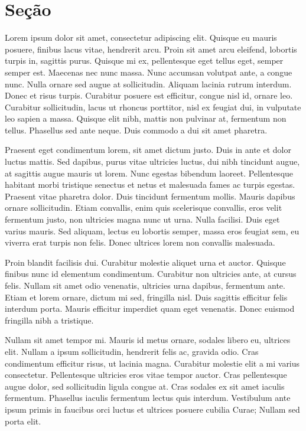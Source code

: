 \documentclass{article}
\begin{document}
	
	\section{Seção}
	
	Lorem ipsum dolor sit amet, consectetur adipiscing elit. Quisque eu mauris posuere, finibus lacus vitae, hendrerit arcu. Proin sit amet arcu eleifend, lobortis turpis in, sagittis purus. Quisque mi ex, pellentesque eget tellus eget, semper semper est. Maecenas nec nunc massa. Nunc accumsan volutpat ante, a congue nunc. Nulla ornare sed augue at sollicitudin. Aliquam lacinia rutrum interdum. Donec et risus turpis. Curabitur posuere est efficitur, congue nisl id, ornare leo. Curabitur sollicitudin, lacus ut rhoncus porttitor, nisl ex feugiat dui, in vulputate leo sapien a massa. Quisque elit nibh, mattis non pulvinar at, fermentum non tellus. Phasellus sed ante neque. Duis commodo a dui sit amet pharetra.
	
	 Praesent eget condimentum lorem, sit amet dictum justo. Duis in ante et dolor luctus mattis. Sed dapibus, purus vitae ultricies luctus, dui nibh tincidunt augue, at sagittis augue mauris ut lorem. Nunc egestas bibendum laoreet. Pellentesque habitant morbi tristique senectus et netus et malesuada fames ac turpis egestas. Praesent vitae pharetra dolor. Duis tincidunt fermentum mollis. Mauris dapibus ornare sollicitudin. Etiam convallis, enim quis scelerisque convallis, eros velit fermentum justo, non ultricies magna nunc ut urna. Nulla facilisi. Duis eget varius mauris. Sed aliquam, lectus eu lobortis semper, massa eros feugiat sem, eu viverra erat turpis non felis. Donec ultrices lorem non convallis malesuada.


Proin blandit facilisis dui. Curabitur molestie aliquet urna et auctor. Quisque finibus nunc id elementum condimentum. Curabitur non ultricies ante, at cursus felis. Nullam sit amet odio venenatis, ultricies urna dapibus, fermentum ante. Etiam et lorem ornare, dictum mi sed, fringilla nisl. Duis sagittis efficitur felis interdum porta. Mauris efficitur imperdiet quam eget venenatis. Donec euismod fringilla nibh a tristique.

Nullam sit amet tempor mi. Mauris id metus ornare, sodales libero eu, ultrices elit. Nullam a ipsum sollicitudin, hendrerit felis ac, gravida odio. Cras condimentum efficitur risus, ut lacinia magna. Curabitur molestie elit a mi varius consectetur. Pellentesque ultricies eros vitae tempor auctor. Cras pellentesque augue dolor, sed sollicitudin ligula congue at. Cras sodales ex sit amet iaculis fermentum. Phasellus iaculis fermentum lectus quis interdum. Vestibulum ante ipsum primis in faucibus orci luctus et ultrices posuere cubilia Curae; Nullam sed porta elit.
\end{document}
